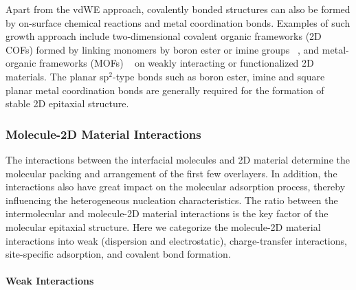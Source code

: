 Apart from the vdWE approach, covalently bonded structures can also be
formed by on-surface chemical reactions and metal coordination
bonds. Examples of such growth approach include two-dimensional
covalent organic frameworks (2D COFs) formed by linking monomers by
boron ester or imine groups
~\autocite{Colson_2014_2D_COF_gr,Colson_2011_2DMOF_gr,Sun_2017_COF_VFET},
and metal-organic frameworks (MOFs)
~\autocite{Urgel_2015_MOF_BN,Kumar_2014_2D_MOF_gr} on weakly interacting
or functionalized 2D materials. The planar sp$^{2}$-type bonds such as
boron ester, imine and square planar metal coordination bonds are
generally required for the formation of stable 2D epitaxial structure.

\subsubsection{Molecule-2D Material Interactions}
\label{sec:intro-mol-2D}

The interactions between the interfacial molecules and 2D material
determine the molecular packing and arrangement of the first few
overlayers. In addition, the interactions also have great impact on
the molecular adsorption process, thereby influencing the
heterogeneous nucleation characteristics. The
ratio between the intermolecular and molecule-2D material
interactions is the key factor of the molecular epitaxial
structure. Here we categorize the molecule-2D material interactions
into weak (dispersion and electrostatic), charge-transfer
interactions, site-specific adsorption, and covalent bond formation.

\paragraph{Weak Interactions}
\label{sec:org68af064}

